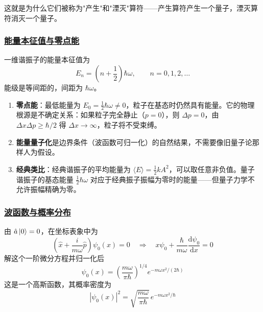 这就是为什么它们被称为"产生"和"湮灭"算符——产生算符产生一个量子，湮灭算符消灭一个量子。

\subsubsection{\protect\hyperlink{:}{能量本征值与零点能}}

\begin{theorem}[一维谐振子的能谱]
    一维谐振子的能量本征值为
    \begin{equation}
        E_n = \left(n + \frac{1}{2}\right)\hbar\omega, \qquad n = 0, 1, 2, \ldots
    \end{equation}
    能级是等间距的，间距为 $\hbar\omega$。
\end{theorem}

\begin{remark}
    \begin{enumerate}
        \item \textbf{零点能}：最低能量为 $E_0 = \frac{1}{2}\hbar\omega \neq 0$，粒子在基态时仍然具有能量。它的物理根源是不确定关系：如果粒子完全静止（$p = 0$），则 $\Delta p = 0$，由 $\Delta x \Delta p \geq \hbar/2$ 得 $\Delta x \to \infty$，粒子将不受束缚。
        \item \textbf{能量量子化}是边界条件（波函数可归一化）的自然结果，不需要像旧量子论那样人为假设。
        \item \textbf{经典类比}：经典谐振子的平均能量为 $\langle E \rangle = \frac{1}{2}kA^2$，可以取任意非负值。量子谐振子的基态能量 $\frac{1}{2}\hbar\omega$ 对应于经典振子振幅为零时的能量——但量子力学不允许振幅精确为零。
    \end{enumerate}
\end{remark}

\subsubsection{\protect\hyperlink{:}{波函数与概率分布}}

\begin{definition}[基态波函数]
    由 $\hat{a}\ket{0} = 0$，在坐标表象中为
    \begin{equation}
        \left(\hat{x} + \frac{i}{m\omega}\hat{p}\right)\psi_0(x) = 0 \quad \Longrightarrow \quad x\psi_0 + \frac{\hbar}{m\omega}\frac{\mathrm{d}\psi_0}{\mathrm{d}x} = 0
    \end{equation}
    解这个一阶微分方程并归一化后
    \begin{equation}
        \psi_0(x) = \left(\frac{m\omega}{\pi\hbar}\right)^{1/4} e^{-m\omega x^2/(2\hbar)}
    \end{equation}
    这是一个高斯函数，其概率密度为
    \begin{equation}
        |\psi_0(x)|^2 = \sqrt{\frac{m\omega}{\pi\hbar}}\,e^{-m\omega x^2/\hbar}
    \end{equation}
\end{definition}

